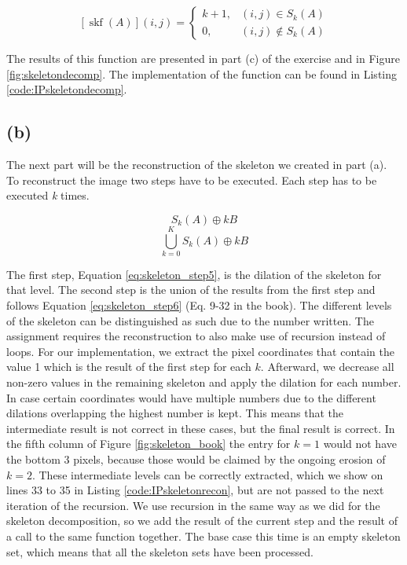 \documentclass{article}
\begin{document}
\begin{equation}\label{eq:skeleton_encoding}
[\operatorname{skf}(A)](i, j)=\left\{\begin{array}{ll}
k+1, & (i, j) \in S_{k}(A) \\
0, & (i, j) \notin S_{k}(A)
\end{array}\right.
\end{equation}

The results of this function are presented in part (c) of the exercise and in Figure \ref{fig:skeletondecomp}. The implementation of the function can be found in  Listing \ref{code:IPskeletondecomp}.

\subsection*{(b)}
The next part will be the reconstruction of the skeleton we created in part (a). To reconstruct the image two steps have to be executed. Each step has to be executed \textit{k} times.

\begin{equation}\label{eq:skeleton_step5}
    S_k(A) \oplus k B
\end{equation}
\begin{equation}\label{eq:skeleton_step6}
    \bigcup_{k=0}^{K}S_k(A) \oplus k B
\end{equation}

The first step, Equation \ref{eq:skeleton_step5}, is the dilation of the skeleton for that level. The second step is the union of the results from the first step and follows Equation \ref{eq:skeleton_step6} (Eq. 9-32 in the book). The different levels of the skeleton can be distinguished as such due to the number written. The assignment requires the reconstruction to also make use of recursion instead of loops. For our implementation, we extract the pixel coordinates that contain the value 1 which is the result of the first step for each $k$. Afterward, we decrease all non-zero values in the remaining skeleton and apply the dilation for each number. In case certain coordinates would have multiple numbers due to the different dilations overlapping the highest number is kept. This means that the intermediate result is not correct in these cases, but the final result is correct. In the fifth column of Figure \ref{fig:skeleton_book} the entry for $k=1$ would not have the bottom 3 pixels, because those would be claimed by the ongoing erosion of $k=2$. These intermediate levels can be correctly extracted, which we show on lines 33 to 35 in  Listing \ref{code:IPskeletonrecon}, but are not passed to the next iteration of the recursion. We use recursion in the same way as we did for the skeleton decomposition, so we add the result of the current step and the result of a call to the same function together. The base case this time is an empty skeleton set, which means that all the skeleton sets have been processed.
\end{document}
